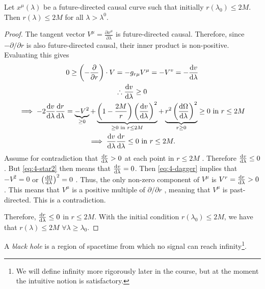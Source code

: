 \begin{claim}
  Let $x^{\mu}(\lambda)$ be a future-directed causal curve such that initially $r (\lambda_0) \leq 2M$. 
  Then $r(\lambda) \leq 2M$ for all $\lambda > \lambda^0$.
\end{claim}
\begin{proof}
  The tangent vector $V^{\mu} = \frac{\partial x^{\mu}}{\partial \lambda}$ is future-directed causal.
  Therefore, since $- \partial / \partial r$  is also future-directed causal, their inner product is non-positive. Evaluating this gives
  \begin{gather}
    0 \geq \left( -\frac{\partial }{\partial r} \right) \cdot V = - g_{r \mu} V^{\mu} = - V^{v} = - \dv{v}{\lambda} \\
    \therefore \dv{v}{\lambda} \geq 0 \label{eq:4-star2} \\
    \implies -2 \dv{v}{\lambda} \dv{r}{\lambda} = \underbrace{-V^2}_{\mathclap{ \geq 0}} + \underbrace{\left( 1 - \frac{2M}{r} \right) \left( \dv{v}{\lambda} \right)^2}_{\mathclap{ \geq 0 \text{ in } r \leq 2M}}
    + \underbrace{r^2 \left( \dv{\Omega}{\lambda} \right)^2}_{\mathclap{r \geq 0}} \geq 0 \text{ in } r \leq 2M \label{eq:4-dagger} \\
    \implies \dv{v}{\lambda} \dv{r}{\lambda} \leq 0 \text{ in } r \leq 2M.
  \end{gather}
  Assume for contradiction that $\dv{r}{\lambda} > 0$  at each point in $r \leq 2M$ .
  Therefore $\dv{v}{\lambda} \leq 0$ . But  \eqref{eq:4-star2} then means that $\dv{v}{\lambda} = 0$.
  Then \eqref{eq:4-dagger} implies that $-V^2  = 0$  or $\left( \dv{\Omega}{\lambda} \right)^2 = 0$ .
  Thus, the only non-zero component of $V^{\mu}$  is $V^r = \dv{r}{\lambda} > 0$ .
  This means that $V^{\mu}$  is a positive multiple of $\partial / \partial r$ , meaning that $V^{\mu}$  is past-directed. This is a contradiction.

  Therefore, $\dv{r}{\lambda} \leq 0$  in $r \leq 2M$. With the initial condition $r(\lambda_0) \leq 2M$, we have that $r(\lambda) \leq 2M$ $\forall \lambda \geq \lambda_0$.
\end{proof}

\begin{definition}
  A \emph{black hole} is a region of spacetime from which no signal can reach infinity\footnote{We will define infinity more rigorously later in the course, but at the moment the intuitive notion is satisfactory.}.
\end{definition}


